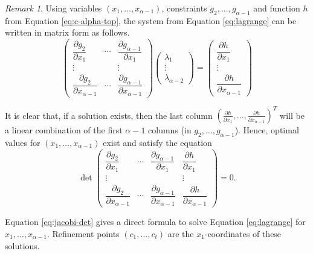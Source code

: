 \documentclass[
]{book}
\theoremstyle{definition}
\theoremstyle{definition}
\theoremstyle{definition}
\theoremstyle{definition}
\theoremstyle{remark}
\newtheorem*{remark}{Remark}
\begin{document}
\begin{remark}
Using variables \((x_1,\ldots,x_{\alpha-1})\), constraints \(g_2,\ldots,g_{\alpha - 1}\) and function \(h\) from Equation \eqref{eq:c-alpha-top}, the system from Equation \eqref{eq:lagrange} can be written in matrix form as follows.
\[
\begin{pmatrix}\dfrac{\partial g_{2}}{\partial x_{1}} & \cdots & \dfrac{\partial g_{\alpha-1}}{\partial x_{1}}\\
\vdots &  & \vdots\\
\dfrac{\partial g_{2}}{\partial x_{\alpha-1}} & \cdots & \dfrac{\partial g_{\alpha-1}}{\partial x_{\alpha-1}}
\end{pmatrix}\begin{pmatrix}\lambda_{1}\\
\vdots\\
\lambda_{\alpha-2}
\end{pmatrix}=\begin{pmatrix}\dfrac{\partial h}{\partial x_{1}}\\
\vdots\\
\dfrac{\partial h}{\partial x_{\alpha-1}}
\end{pmatrix}
\]

It is clear that, if a solution exists, then the last column
\(\left(\tfrac{\partial h}{\partial x_{1}},\ldots, \tfrac{\partial h}{\partial x_{\alpha-1}}\right)^T\)
will be a linear combination of the first \(\alpha - 1\) columns (in \(g_2,\ldots,g_{\alpha - 1}\)).
Hence, optimal values for \((x_1,\ldots,x_{\alpha-1})\) exist and satisfy the equation
\begin{equation}
\det\begin{pmatrix}\dfrac{\partial g_{2}}{\partial x_{1}} & \cdots & \dfrac{\partial g_{\alpha-1}}{\partial x_{1}} & \dfrac{\partial h}{\partial x_{1}}\\
\vdots &  &  & \vdots\\
\dfrac{\partial g_{2}}{\partial x_{\alpha-1}} & \cdots & \dfrac{\partial g_{\alpha-1}}{\partial x_{\alpha-1}} & \dfrac{\partial h}{\partial x_{\alpha-1}}
\end{pmatrix}=0.
\label{eq:jacobi-det}
\end{equation}
\end{remark}

Equation \eqref{eq:jacobi-det} gives a direct formula to solve Equation \eqref{eq:lagrange} for \(x_1,\ldots,x_{\alpha - 1}\). Refinement points \((c_1,\ldots,c_t)\) are the \(x_1\)-coordinates of these solutions.
\end{document}
